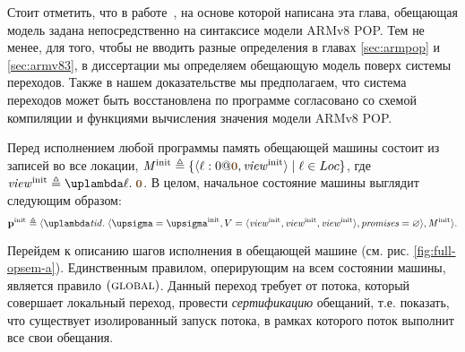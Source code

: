 Стоит отметить, что в работе~\cite{Podkopaev-al:ECOOP17}, на основе которой написана эта глава,
обещающая модель задана непосредственно на синтаксисе модели ARMv8 POP.
Тем не менее, для того, чтобы не вводить разные определения в главах \ref{sec:armpop} и
\ref{sec:armv83}, в диссертации мы определяем обещающую модель поверх системы переходов.
Также в нашем доказательстве мы предполагаем, что система переходов может быть восстановлена
по программе согласовано со схемой компиляции и функциями вычисления значения модели ARMv8 POP.

Перед исполнением любой программы память обещающей машины состоит из записей во все локации,
$\Mprom^{\rm init} \triangleq \{ \writeEvt{\loc}{0}{\tstamp{0}}{\R^{\rm init}} \mid \loc \in \Loc \}$,
где $\R^{\rm init} \triangleq \lambda \loc. \; \tstamp{0}$. В целом, начальное состояние машины выглядит следующим образом:
\[
  \pinit \triangleq \angled{
     \lambda \tId. \; \angled{\pstate = \pstate^{\rm init},
                              \V = \angled{\R^{\rm init}, \R^{\rm init}, \R^{\rm init}}, \PromSet = \emptyset},
     \Mprom^{\rm init}}.
\]

Перейдем к описанию шагов исполнения в обещающей машине (см. рис. \ref{fig:full-opsem-a}).
Единственным правилом, оперирующим на всем состоянии машины, является правило $(\textsc{global})$.
Данный переход требует от потока,
который совершает локальный переход, провести \emph{сертификацию} обещаний, т.е. показать,
что существует изолированный запуск потока, в рамках которого поток выполнит все свои обещания.


